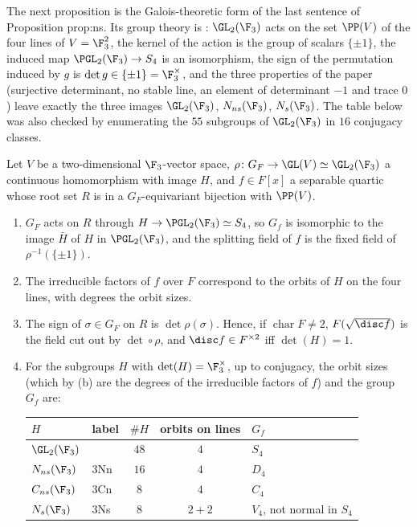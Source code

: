 The next proposition is the Galois-theoretic form of the last sentence of Proposition prop:ns. Its group theory is : $\GL_2(\F_3)$ acts on the set
$\PP(V)$ of the four lines of $V=\F_3^2$, the kernel of the action is the group of scalars $\{\pm1\}$, the induced map $\PGL_2(\F_3)\to S_4$ is an isomorphism, the sign of
the permutation induced by $g$ is $\det g\in\{\pm1\}=\F_3^\times$, and the three properties of the paper (surjective determinant, no stable line, an element of
determinant $-1$ and trace $0$) leave exactly the three images $\GL_2(\F_3)$, $N_{ns}(\F_3)$, $N_s(\F_3)$. The table below was also checked by enumerating the $55$
subgroups of $\GL_2(\F_3)$ in $16$ conjugacy classes.

\begin{proposition}\label{prop:galois:quartic-on-lines}
Let $V$ be a two-dimensional $\F_3$-vector space, $\rho\colon G_F\to\GL(V)\simeq\GL_2(\F_3)$ a continuous homomorphism with image $H$, and $f\in F[x]$ a separable
quartic whose root set $R$ is in a $G_F$-equivariant bijection with $\PP(V)$.
\begin{enumerate}[label=(\alph*)]
\item $G_F$ acts on $R$ through $H\to\PGL_2(\F_3)\simeq S_4$, so $G_f$ is isomorphic to the image $\bar H$ of $H$ in $\PGL_2(\F_3)$, and the splitting field of $f$ is the
fixed field of $\rho^{-1}(\{\pm1\})$.
\item The irreducible factors of $f$ over $F$ correspond to the orbits of $H$ on the four lines, with degrees the orbit sizes.
\item The sign of $\sigma\in G_F$ on $R$ is $\det\rho(\sigma)$. Hence, if $\operatorname{char}F\ne2$, $F(\sqrt{\disc f})$ is the field cut out by $\det\circ\rho$, and
$\disc f\in F^{\times2}$ iff $\det(H)=1$.
\item For the subgroups $H$ with $\det(H)=\F_3^\times$, up to conjugacy, the orbit sizes (which by (b) are the degrees of the irreducible factors of $f$)
and the group $G_f$ are:
\begin{center}
\begin{tabular}{llccl}
\toprule
$H$ & label & $\#H$ & orbits on lines & $G_f$\\
\midrule
$\GL_2(\F_3)$ & & $48$ & $4$ & $S_4$\\
$N_{ns}(\F_3)$ & 3Nn & $16$ & $4$ & $D_4$\\
$C_{ns}(\F_3)$ & 3Cn & $8$ & $4$ & $C_4$\\
$N_s(\F_3)$ & 3Ns & $8$ & $2+2$ & $V_4$, not normal in $S_4$\\

\end{tabular}
\end{center}
\end{enumerate}
\end{proposition}
